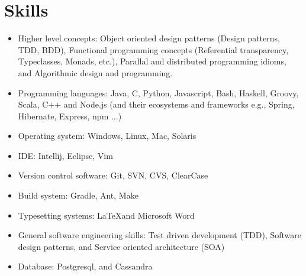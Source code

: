 \section{Skills}
\begin{itemize}
\item Higher level concepts: Object oriented design patterns (Design patterns, TDD, BDD), Functional programming concepts (Referential transparency, Typeclasses, Monads, etc.), Parallal and distributed programming idioms, and Algorithmic design and programming.

\item Programming languages: Java, C, Python, Javascript, Bash, Haskell, Groovy, Scala, C++ and Node.js (and their ecosystems and frameworks e.g., Spring, Hibernate, Express, npm ...)


\item Operating system: Windows, Linux, Mac, Solaris

\item IDE: Intellij, Eclipse, Vim

\item Version control software: Git, SVN, CVS, ClearCase

\item Build system: Gradle, Ant, Make



\item Typesetting systems: \LaTeX and Microsoft Word

\item General software engineering skills: Test driven development (TDD), Software design patterns, and Service oriented architecture (SOA)

\item Database: Postgresql, and Cassandra

\end{itemize}
